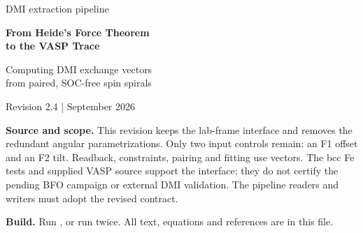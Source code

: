 \documentclass[11pt,a4paper]{article}
\numberwithin{equation}{section}
\newcommand{\code}[1]{\texttt{\detokenize{#1}}}
\begin{document}
\hypersetup{pageanchor=false}
\begin{titlepage}
\vspace*{15mm}
{\large DMI extraction pipeline\par}
\vspace{12mm}
{\LARGE\bfseries From Heide's Force Theorem\\[3pt] to the VASP Trace\par}
\vspace{8mm}
{\large Computing DMI exchange vectors\\
from paired, SOC-free spin spirals\par}
\vspace{10mm}
{\large Revision 2.4 \quad |  September 2026\par}
\vspace{13mm}
\begin{abstract}
\noindent
The calculation has three parts. First, VASP prepares a SOC-free spin spiral
with the required sublattice directions. Second, a frozen-state PAW trace
gives its first-order spin--orbit energy. Third, differences between paired
spirals determine the bond Dzyaloshinskii--Moriya vectors.

This document derives the quantities needed for those steps and maps them
to VASP inputs and the Patch B dumps. Initial moments, constraint targets
and realized site directions are expressed in one lab-frame convention.
OSZICAR sphere moments supply the magnetic readback; VASP handles the
internal spiral representation. The bond model uses the measured unit vectors directly, without
extracting site angles or introducing an intermediate unwinding step.

The formulation covers the flat, phase-decorated and conical families used
by the implementation. It retains the checks needed to establish that the
DFT states, trace and bond model agree, without developing a general theory
of constrained magnetism or statistical inference.
\end{abstract}
\vfill
\textbf{Source and scope.} This revision keeps the lab-frame
interface and removes the redundant angular parametrizations. Only two
input controls remain: an F1 offset and an F2 tilt. Readback, constraints,
pairing and fitting use vectors. The bcc Fe tests and supplied VASP source support the interface;
they do not certify the pending BFO campaign or external DMI validation.
The pipeline readers and writers must adopt the revised contract.

\textbf{Build.} Run \code{latexmk -pdf heide_math_v2.tex}, or run
\code{pdflatex} twice. All text, equations and references are in this file.
\end{titlepage}
\hypersetup{pageanchor=true}
\tableofcontents
\clearpage
{}
\end{document}
